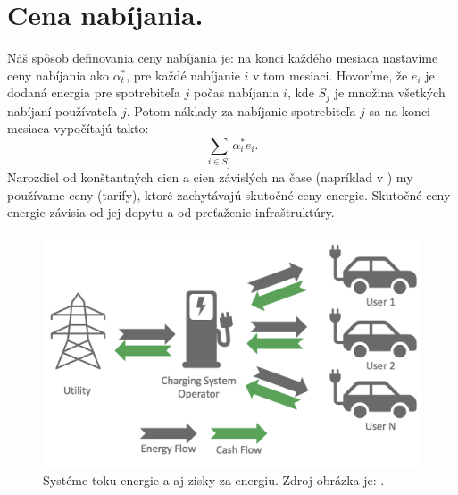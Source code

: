 


\section{Cena nabíjania.}
Náš spôsob definovania ceny nabíjania je: na konci každého mesiaca nastavíme ceny nabíjania ako $\alpha_{t}^{*}$, pre každé nabíjanie $i$ v tom mesiaci. Hovoríme, že $e_{i}$ je dodaná energia pre spotrebiteľa $j$ počas nabíjania $i$, kde $S_{j}$ je množina všetkých nabíjaní používateľa $j$. Potom náklady za nabíjanie spotrebiteľa $j$ sa na konci mesiaca vypočítajú takto:
\begin{equation}
    \sum_{i \in S_{j}}  \alpha_{i}^{*}e_{i}. 
\end{equation}
Narozdiel od konštantných cien a cien závislých na čase (napríklad v \cite{Li_2021}) my používame ceny (tarify), ktoré zachytávajú skutočné ceny energie. Skutočné ceny energie závisia od jej dopytu a od preťaženie infraštruktúry.  \cite{evpricingsystem}


\begin{figure}[H]
    \includegraphics[width=\textwidth]{images/energy_flow_costs.png}
    \centering
    \caption[Systém toku energie a ziskov.]{Systéme toku energie a aj zisky za energiu. Zdroj obrázka je: \cite{websitpricecharging2023}.}
    \label{architectureacnsim:obr2}
    \end{figure}

